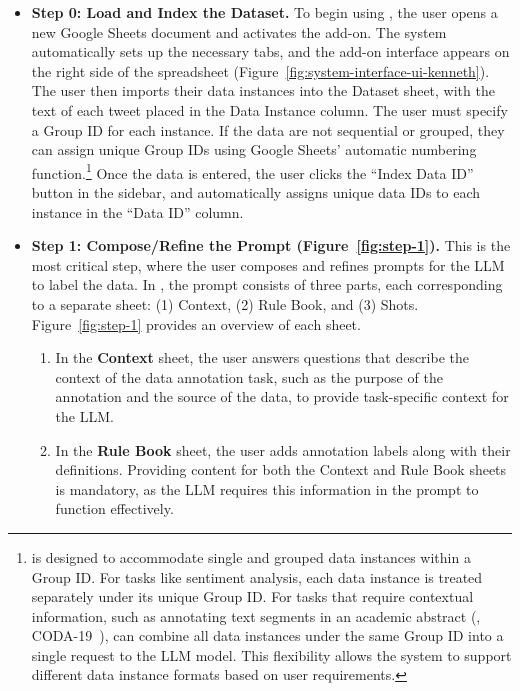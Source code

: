 \begin{itemize}
   
\item 
\textbf{Step 0: Load and Index the Dataset.}
To begin using \system, the user opens a new Google Sheets document and activates the \system add-on. 
The system automatically sets up the necessary tabs, and the add-on interface appears on the right side of the spreadsheet (Figure~\ref{fig:system-interface-ui-kenneth}). 
The user then imports their data instances into the Dataset sheet, with the text of each tweet placed in the Data Instance column. 
The user must specify a Group ID for each instance. 
If the data are not sequential or grouped, they can assign unique Group IDs using Google Sheets' automatic numbering function.\footnote{\system is designed to accommodate single and grouped data instances within a Group ID. For tasks like sentiment analysis, each data instance is treated separately under its unique Group ID. For tasks that require contextual information, such as annotating text segments in an academic abstract (\eg, CODA-19~\cite{huang-etal-2020-coda}), \system can combine all data instances under the same Group ID into a single request to the LLM model. This flexibility allows the system to support different data instance formats based on user requirements.} 
Once the data is entered, the user clicks the ``Index Data ID'' button in the sidebar, and \system automatically assigns unique data IDs to each instance in the ``Data ID'' column.

\item 
\textbf{Step 1: Compose/Refine the Prompt (Figure~\ref{fig:step-1}).}
This is the most critical step, where the user composes and refines prompts for the LLM to label the data. 
In \system, the prompt consists of three parts, each corresponding to a separate sheet: (1) Context, (2) Rule Book, and (3) Shots. 
Figure~\ref{fig:step-1} provides an overview of each sheet.
\begin{enumerate}

\item 
In the \textbf{Context} sheet, the user answers questions that describe the context of the data annotation task, such as the purpose of the annotation and the source of the data, to provide task-specific context for the LLM.

\item
In the \textbf{Rule Book} sheet, the user adds annotation labels along with their definitions. Providing content for both the Context and Rule Book sheets is mandatory, as the LLM requires this information in the prompt to function effectively.


\end{enumerate}
\end{itemize}
